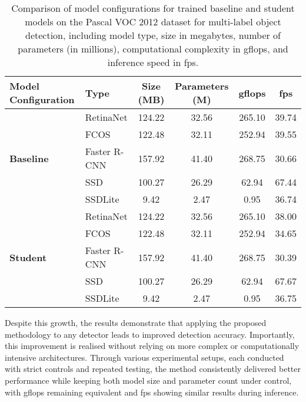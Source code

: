 \begin{table}[!ht]
    \centering
     \begin{adjustbox}{width=\textwidth}
    \begin{tabular}{llcccc}
        \toprule
        \textbf{Model Configuration} & \textbf{Type} & \textbf{Size (MB)} & \textbf{Parameters (M)} & \textbf{\gls{gflops}} & \textbf{\gls{fps}} \\
        \midrule
        \multirow{5}{*}{\textbf{Baseline}} 
            & RetinaNet     & 124.22 & 32.56 & 265.10 & 39.74 \\
            & FCOS          & 122.48 & 32.11 & 252.94 & 39.55 \\
            & Faster R-CNN  & 157.92 & 41.40 & 268.75 & 30.66 \\
            & SSD           & 100.27 & 26.29 & 62.94 & 67.44 \\
            & SSDLite       & 9.42   & 2.47 & 0.95 & 36.74 \\
        \midrule
        \multirow{5}{*}{\textbf{Student}} 
            & RetinaNet     & 124.22 & 32.56 & 265.10 & 38.00 \\
            & FCOS          & 122.48 & 32.11 & 252.94 & 34.65 \\
            & Faster R-CNN  & 157.92 & 41.40 & 268.75 & 30.39 \\
            & SSD           & 100.27 & 26.29 & 62.94 & 67.67 \\
            & SSDLite       & 9.42   & 2.47 & 0.95 & 36.75 \\
        \bottomrule
    \end{tabular}
    \end{adjustbox}
    \caption{Comparison of model configurations for trained baseline and student models on the Pascal VOC 2012 dataset for multi-label object detection, including model type, size in megabytes, number of parameters (in millions), computational complexity in \gls{gflops}, and inference speed in \gls{fps}.}
    \label{tab:model_configs_pascal_voc}
\end{table}

Despite this growth, the results demonstrate that applying the proposed methodology to any detector leads to improved detection accuracy. Importantly, this improvement is realised without relying on more complex or computationally intensive architectures. Through various experimental setups, each conducted with strict controls and repeated testing, the method consistently delivered better performance while keeping both model size and parameter count under control, with \gls{gflops} remaining equivalent and \gls{fps} showing similar results during inference.


